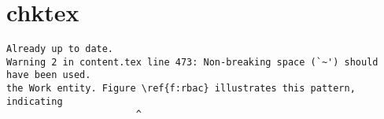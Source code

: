\appendix
\section{chktex}
\begin{tiny}
\begin{verbatim}
Already up to date.
Warning 2 in content.tex line 473: Non-breaking space (`~') should have been used.
the Work entity. Figure \ref{f:rbac} illustrates this pattern, indicating  
                       ^
\end{verbatim}
\end{tiny}
